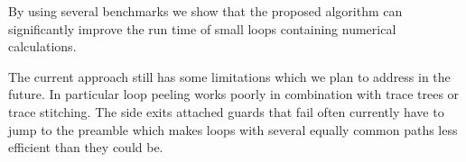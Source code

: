 \documentclass[preprint]{sigplanconf}
\begin{document}
By using several benchmarks we show that the proposed algorithm can
significantly improve the run time of small loops containing numerical
calculations. 

The current approach still has some limitations which we plan to address in the
future. In particular loop peeling works poorly in combination with trace
trees or trace stitching. The side exits attached guards that fail often
currently have to jump to the preamble which makes loops with several equally
common paths less efficient than they could be.







\end{document}
